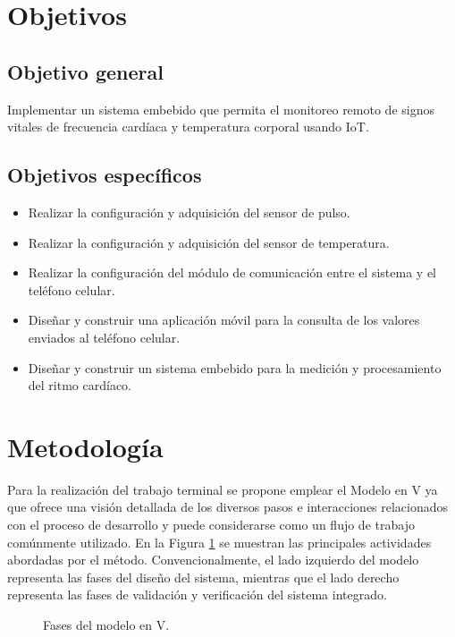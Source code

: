 \section{Objetivos}
\subsection{Objetivo general}
Implementar un sistema embebido que permita el monitoreo remoto de signos vitales de frecuencia cardíaca y temperatura corporal usando IoT.
\subsection{Objetivos específicos}
	\begin{itemize}
		\item Realizar la configuración y adquisición del sensor de pulso.
		\item Realizar la configuración y adquisición del sensor de temperatura.
		\item Realizar la configuración del módulo de comunicación entre el sistema y el teléfono celular.
		\item Diseñar y construir una aplicación móvil para la consulta de los valores enviados al teléfono celular.
		\item Diseñar y construir un sistema embebido para la medición y procesamiento del ritmo cardíaco.
	\end{itemize}	

\section{Metodología}
Para la realización del trabajo terminal se propone emplear el Modelo en V ya que ofrece una visión detallada de los diversos pasos e interacciones relacionados con el proceso de desarrollo y puede considerarse como un flujo de trabajo comúnmente utilizado. En la Figura \ref{fig:IntroduccionMetodologia} se muestran las principales actividades abordadas por el método. Convencionalmente, el lado izquierdo del modelo representa las fases del diseño del sistema, mientras que el lado derecho representa las fases de validación y verificación del sistema integrado.

\begin{figure}[htbp!]
	\centering
	\caption{Fases del modelo en V.}
	\label{fig:IntroduccionMetodologia}
\end{figure}

